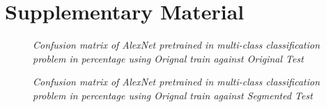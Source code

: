 \section{Supplementary Material}
\begin{figure}[H]
	\begin{center}
	\end{center}
	\caption{\textit{Confusion matrix of AlexNet pretrained in multi-class classification problem in percentage using Orignal train against Original Test}}
	\label{fig:add1}
\end{figure}


\begin{figure}[H]
	\begin{center}
	\end{center}
	\caption{\textit{Confusion matrix of AlexNet pretrained in multi-class classification problem in percentage using Orignal train against Segmented Test}}
	\label{fig:add2}
\end{figure}